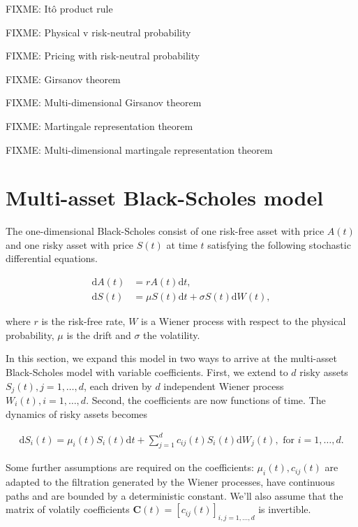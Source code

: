 \documentclass[a4paper]{article}
\begin{document}
FIXME: It\^o product rule

FIXME: Physical v risk-neutral probability

FIXME: Pricing with risk-neutral probability

FIXME: Girsanov theorem

FIXME: Multi-dimensional Girsanov theorem

FIXME: Martingale representation theorem

FIXME: Multi-dimensional martingale representation theorem

\pagebreak
\section{Multi-asset Black-Scholes model}


The one-dimensional Black-Scholes consist of one risk-free asset with price $A(t)$ and one risky asset with price $S(t)$ at time $t$ satisfying the following stochastic differential equations.

\begin{align*}
  \mathrm{d}A(t) &= r A(t) \mathrm{d}t,\\
  \mathrm{d}S(t) &= \mu S(t) \mathrm{d}t + \sigma S(t) \mathrm{d}W(t),
\end{align*}

where $r$ is the risk-free rate, $W$ is a Wiener process with respect to the physical probability, $\mu$ is the drift and $\sigma$ the volatility.

In this section, we expand this model in two ways to arrive at the multi-asset Black-Scholes model with variable coefficients. First, we extend to $d$ risky assets $S_j(t), j =  1, \ldots, d$, each driven by $d$ independent Wiener process $W_i(t), i = 1, \ldots, d$. Second, the coefficients are now functions of time. The dynamics of risky assets becomes

\begin{align}\label{eq:multi-bs-eq}
  \mathrm{d}S_i(t) = \mu_i(t) S_i(t) \mathrm{d}t + \sum_{j=1}^{d} c_{ij}(t) S_i(t) \mathrm{d}W_j(t), \text{ for } i = 1,\ldots,d.
\end{align}

Some further assumptions are required on the coefficients: $\mu_i(t), c_{ij}(t)$ are adapted to the filtration generated by the Wiener processes, have continuous paths and are bounded by a deterministic constant. We'll also assume that the matrix of volatily coefficients $\mathbf{C}(t) = [c_{ij}(t)]_{i,j=1,\ldots,d}$ is invertible.
\end{document}
